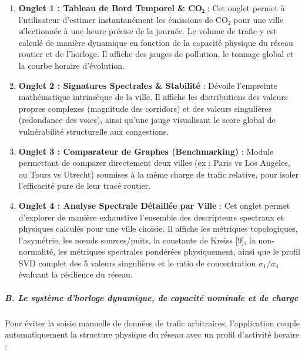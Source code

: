 \documentclass[10pt, a4paper]{article}
\providecommand{\tightlist}{}
\begin{document}
\begin{enumerate}
\def\labelenumi{\arabic{enumi}.}
\tightlist
\item
  \textbf{Onglet 1 : Tableau de Bord Temporel \& CO₂} : Cet onglet
  permet à l'utilisateur d'estimer instantanément les émissions de CO₂
  pour une ville sélectionnée à une heure précise de la journée. Le
  volume de trafic y est calculé de manière dynamique en fonction de la
  capacité physique du réseau routier et de l'horloge. Il affiche des
  jauges de pollution, le tonnage global et la courbe horaire
  d'évolution.
\item
  \textbf{Onglet 2 : Signatures Spectrales \& Stabilité} : Dévoile
  l'empreinte mathématique intrinsèque de la ville. Il affiche les
  distributions des valeurs propres complexes (magnitude des corridors)
  et des valeurs singulières (redondance des voies), ainsi qu'une jauge
  visualisant le score global de vulnérabilité structurelle aux
  congestions.
\item
  \textbf{Onglet 3 : Comparateur de Graphes (Benchmarking)} : Module
  permettant de comparer directement deux villes (ex : Paris vs Los
  Angeles, ou Tours vs Utrecht) soumises à la même charge de trafic
  relative, pour isoler l'efficacité pure de leur tracé routier.
\item
  \textbf{Onglet 4 : Analyse Spectrale Détaillée par Ville} : Cet onglet
  permet d'explorer de manière exhaustive l'ensemble des descripteurs
  spectraux et physiques calculés pour une ville choisie. Il affiche les
  métriques topologiques, l'asymétrie, les nœuds sources/puits, la
  constante de Kreiss {[}9{]}, la non-normalité, les métriques
  spectrales pondérées physiquement, ainsi que le profil SVD complet des
  5 valeurs singulières et le ratio de concentration
  \(\sigma_1 / \sigma_4\) évaluant la résilience du réseau.
\end{enumerate}

\subparagraph{B. Le système d'horloge dynamique, de capacité nominale et
de
charge}\label{b.-le-systuxe8me-dhorloge-dynamique-de-capacituxe9-nominale-et-de-charge}

Pour éviter la saisie manuelle de données de trafic arbitraires,
l'application couple automatiquement la structure physique du réseau
avec un profil d'activité horaire :
\end{document}
